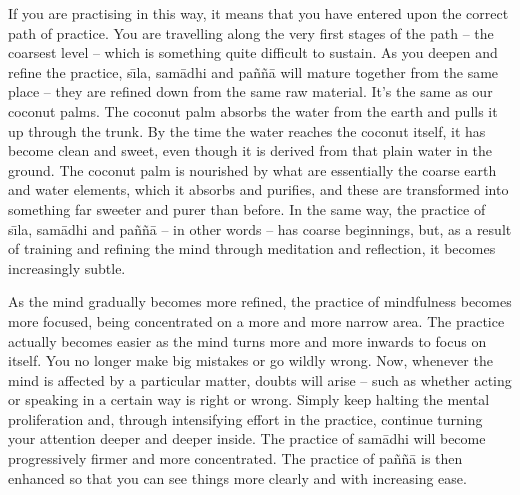 If you are practising in this way, it means that you have entered upon the correct path of practice. You are travelling along the very first stages of the path -- the coarsest level -- which is something quite difficult to sustain. As you deepen and refine the practice, s\={\i}la, sam\=adhi and pa\~n\~n\=a will mature together from the same place -- they are refined down from the same raw material. It's the same as our coconut palms. The coconut palm absorbs the water from the earth and pulls it up through the trunk. By the time the water reaches the coconut itself, it has become clean and sweet, even though it is derived from that plain water in the ground. The coconut palm is nourished by what are essentially the coarse earth and water elements, which it absorbs and purifies, and these are transformed into something far sweeter and purer than before. In the same way, the practice of s\={\i}la, sam\=adhi and pa\~n\~n\=a -- in other words  -- has coarse beginnings, but, as a result of training and refining the mind through meditation and reflection, it becomes increasingly subtle.

As the mind gradually becomes more refined, the practice of mindfulness becomes more focused, being concentrated on a more and more narrow area. The practice actually becomes easier as the mind turns more and more inwards to focus on itself. You no longer make big mistakes or go wildly wrong. Now, whenever the mind is affected by a particular matter, doubts will arise -- such as whether acting or speaking in a certain way is right or wrong. Simply keep halting the mental proliferation and, through intensifying effort in the practice, continue turning your attention deeper and deeper inside. The practice of sam\=adhi will become progressively firmer and more concentrated. The practice of pa\~n\~n\=a is then enhanced so that you can see things more clearly and with increasing ease.

